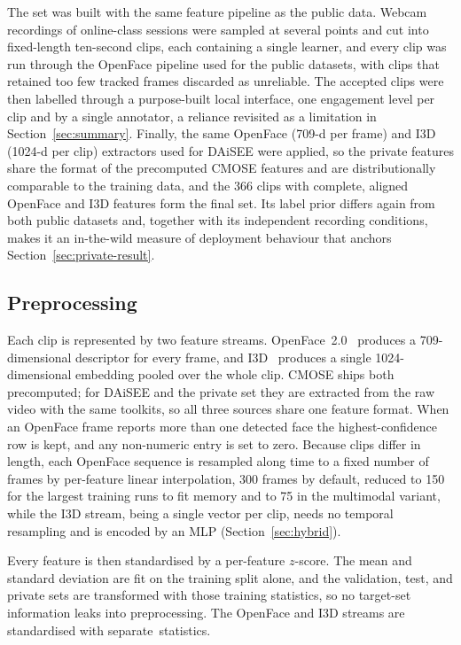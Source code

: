 \documentclass[../main.tex]{subfiles}
\begin{document}
The set was built with the same feature pipeline as the public data. Webcam recordings of online-class sessions were sampled at several points and cut into fixed-length ten-second clips, each containing a single learner, and every clip was run through the OpenFace pipeline used for the public datasets, with clips that retained too few tracked frames discarded as unreliable. The accepted clips were then labelled through a purpose-built local interface, one engagement level per clip and by a single annotator, a reliance revisited as a limitation in Section~\ref{sec:summary}. Finally, the same OpenFace (709-d per frame) and I3D (1024-d per clip) extractors used for DAiSEE were applied, so the private features share the format of the precomputed CMOSE features and are distributionally comparable to the training data, and the 366 clips with complete, aligned OpenFace and I3D features form the final set. Its label prior differs again from both public datasets and, together with its independent recording conditions, makes it an in-the-wild measure of deployment behaviour that anchors Section~\ref{sec:private-result}.

\subsection{Preprocessing}

Each clip is represented by two feature streams. OpenFace~2.0~\cite{openface2} produces a 709-dimensional descriptor for every frame, and I3D~\cite{i3d} produces a single 1024-dimensional embedding pooled over the whole clip. CMOSE ships both precomputed; for DAiSEE and the private set they are extracted from the raw video with the same toolkits, so all three sources share one feature format. When an OpenFace frame reports more than one detected face the highest-confidence row is kept, and any non-numeric entry is set to zero. Because clips differ in length, each OpenFace sequence is resampled along time to a fixed number of frames by per-feature linear interpolation, 300 frames by default, reduced to 150 for the largest training runs to fit memory and to 75 in the multimodal variant, while the I3D stream, being a single vector per clip, needs no temporal resampling and is encoded by an MLP (Section~\ref{sec:hybrid}).

Every feature is then standardised by a per-feature $z$-score. The mean and standard deviation are fit on the training split alone, and the validation, test, and private sets are transformed with those training statistics, so no target-set information leaks into preprocessing. The OpenFace and I3D streams are standardised with separate~statistics.
\end{document}
